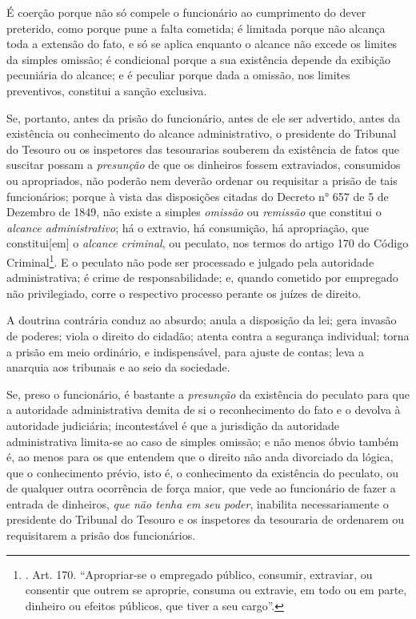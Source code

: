 É coerção porque não só compele o funcionário ao cumprimento do dever
preterido, como porque pune a falta cometida; é limitada porque não
alcança toda a extensão do fato, e só se aplica enquanto o alcance não
excede os limites da simples omissão; é condicional porque a sua
existência depende da exibição pecuniária do alcance; e é peculiar
porque dada a omissão, nos limites preventivos, constitui a sanção
exclusiva.

Se, portanto, antes da prisão do funcionário, antes de ele ser
advertido, antes da existência ou conhecimento do alcance
administrativo, o presidente do Tribunal do Tesouro ou os inspetores das
tesourarias souberem da existência de fatos que suscitar possam a
\emph{presunção} de que os dinheiros fossem extraviados, consumidos ou
apropriados, não poderão nem deverão ordenar ou requisitar a prisão de
tais funcionários; porque à vista das disposições citadas do Decreto n°
657 de 5 de Dezembro de 1849, não existe a simples \emph{omissão} ou
\emph{remissão} que constitui o \emph{alcance administrativo}; há o
extravio, há consumição, há apropriação, que constitui{[}em{]} o
\emph{alcance criminal}, ou peculato, nos termos do artigo 170 do Código
Criminal\footnote{. Art. 170. ``Apropriar-se o empregado público,
  consumir, extraviar, ou consentir que outrem se aproprie, consuma ou
  extravie, em todo ou em parte, dinheiro ou efeitos públicos, que tiver
  a seu cargo''.}. E o peculato não pode ser processado e julgado pela
autoridade administrativa; é crime de responsabilidade; e, quando
cometido por empregado não privilegiado, corre o respectivo processo
perante os juízes de direito.

A doutrina contrária conduz ao absurdo; anula a disposição da lei; gera
invasão de poderes; viola o direito do cidadão; atenta contra a
segurança individual; torna a prisão em meio ordinário, e indispensável,
para ajuste de contas; leva a anarquia aos tribunais e ao seio da
sociedade.

Se, preso o funcionário, é bastante a \emph{presunção} da existência do
peculato para que a autoridade administrativa demita de si o
reconhecimento do fato e o devolva à autoridade judiciária;
incontestável é que a jurisdição da autoridade administrativa limita-se
ao caso de simples omissão; e não menos óbvio também é, ao menos para os
que entendem que o direito não anda divorciado da lógica, que o
conhecimento prévio, isto é, o conhecimento da existência do peculato,
ou de qualquer outra ocorrência de força maior, que vede ao funcionário
de fazer a entrada de dinheiros, \emph{que não tenha em seu poder},
inabilita necessariamente o presidente do Tribunal do Tesouro e os
inspetores da tesouraria de ordenarem ou requisitarem a prisão dos
funcionários.

